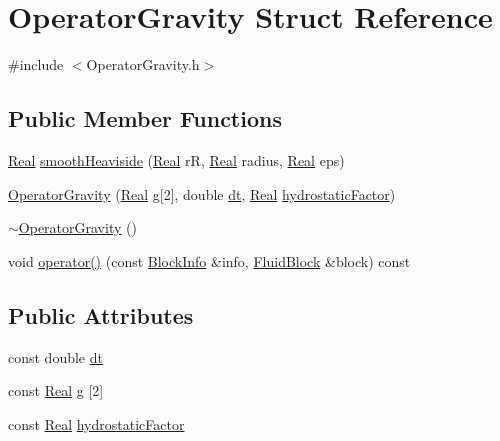 \hypertarget{struct_operator_gravity}{}\section{Operator\+Gravity Struct Reference}
\label{struct_operator_gravity}


{\ttfamily \#include $<$Operator\+Gravity.\+h$>$}

\subsection*{Public Member Functions}
\begin{DoxyCompactItemize}
\item 
\hyperlink{_h_d_f5_dumper_8h_a445a5f0e2a34c9d97d69a3c2d1957907}{Real} \hyperlink{struct_operator_gravity_a75dcdc5463be12de4c3c7f6a271fc6b9}{smooth\+Heaviside} (\hyperlink{_h_d_f5_dumper_8h_a445a5f0e2a34c9d97d69a3c2d1957907}{Real} r\+R, \hyperlink{_h_d_f5_dumper_8h_a445a5f0e2a34c9d97d69a3c2d1957907}{Real} radius, \hyperlink{_h_d_f5_dumper_8h_a445a5f0e2a34c9d97d69a3c2d1957907}{Real} eps)
\item 
\hyperlink{struct_operator_gravity_a3c5e4b3a171dab9dac4606a667252018}{Operator\+Gravity} (\hyperlink{_h_d_f5_dumper_8h_a445a5f0e2a34c9d97d69a3c2d1957907}{Real} \hyperlink{struct_operator_gravity_aa63b78a733552761f6a5624cb57a6560}{g}\mbox{[}2\mbox{]}, double \hyperlink{struct_operator_gravity_a0a6860e7beb6a636eb7c8bd1fc8c8818}{dt}, \hyperlink{_h_d_f5_dumper_8h_a445a5f0e2a34c9d97d69a3c2d1957907}{Real} \hyperlink{struct_operator_gravity_a0981f7c8369f7659c127c30743cb1827}{hydrostatic\+Factor})
\item 
\hyperlink{struct_operator_gravity_a30a6b4f54bfd10d91064d5e48183038e}{$\sim$\+Operator\+Gravity} ()
\item 
void \hyperlink{struct_operator_gravity_a7829a016bf4b27c2213493e363515c90}{operator()} (const \hyperlink{struct_block_info}{Block\+Info} \&info, \hyperlink{struct_fluid_block}{Fluid\+Block} \&block) const 
\end{DoxyCompactItemize}
\subsection*{Public Attributes}
\begin{DoxyCompactItemize}
\item 
const double \hyperlink{struct_operator_gravity_a0a6860e7beb6a636eb7c8bd1fc8c8818}{dt}
\item 
const \hyperlink{_h_d_f5_dumper_8h_a445a5f0e2a34c9d97d69a3c2d1957907}{Real} \hyperlink{struct_operator_gravity_aa63b78a733552761f6a5624cb57a6560}{g} \mbox{[}2\mbox{]}
\item 
const \hyperlink{_h_d_f5_dumper_8h_a445a5f0e2a34c9d97d69a3c2d1957907}{Real} \hyperlink{struct_operator_gravity_a0981f7c8369f7659c127c30743cb1827}{hydrostatic\+Factor}
\end{DoxyCompactItemize}


